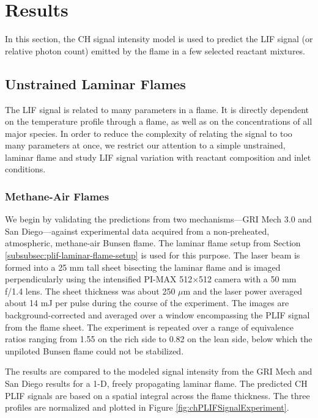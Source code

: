 \section{Results}

In this section, the CH signal intensity model is used to predict the LIF signal (or relative photon count) emitted by the flame in a few selected reactant mixtures.

\subsection{Unstrained Laminar Flames}

The LIF signal is related to many parameters in a flame.
It is directly dependent on the temperature profile through a flame, as well as on the concentrations of all major species.
In order to reduce the complexity of relating the signal to too many parameters at once, we restrict our attention to a simple unstrained, laminar flame and study LIF signal variation with reactant composition and inlet conditions.

\subsubsection{Methane-Air Flames}

We begin by validating the predictions from two mechanisms---GRI Mech 3.0 and San Diego---against experimental data acquired from a non-preheated, atmospheric, methane-air Bunsen flame.
The laminar flame setup from Section \ref{subsubsec:plif-laminar-flame-setup} is used for this purpose.
The laser beam is formed into a 25 mm tall sheet bisecting the laminar flame and is imaged perpendicularly using the intensified PI-MAX 512\(\times\)512 camera with a 50 mm f/1.4 lens.
The sheet thickness was about 250 \(\mu\)m and the laser power averaged about 14 mJ per pulse during the course of the experiment.
The images are background-corrected and averaged over a window encompassing the PLIF signal from the flame sheet.
The experiment is repeated over a range of equivalence ratios ranging from 1.55 on the rich side to 0.82 on the lean side, below which the unpiloted Bunsen flame could not be stabilized.

The results are compared to the modeled signal intensity from the GRI Mech and San Diego results for a 1-D, freely propagating laminar flame.
The predicted CH PLIF signals are based on a spatial integral across the flame thickness.
The three profiles are normalized and plotted in Figure \ref{fig:chPLIFSignalExperiment}.

